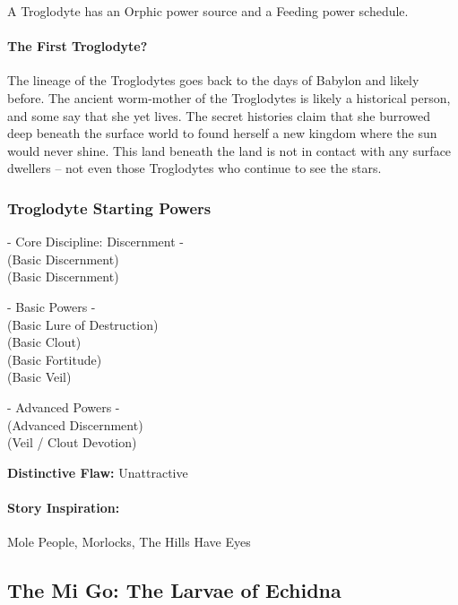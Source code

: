 A Troglodyte has an Orphic power source and a Feeding power schedule.

\paragraph{The First Troglodyte?} The lineage of the Troglodytes goes back to the days of Babylon and likely before. The ancient worm-mother of the Troglodytes is likely a historical person, and some say that she yet lives. The secret histories claim that she burrowed deep beneath the surface world to found herself a new kingdom where the sun would never shine. This land beneath the land is not in contact with any surface dwellers -- not even those Troglodytes who continue to see the stars.

\subsubsection{Troglodyte Starting Powers}

\hspace{\parindent} - Core Discipline: Discernment -\\
 (Basic Discernment)\\
 (Basic Discernment)

- Basic Powers -\\
 (Basic Lure of Destruction)\\
 (Basic Clout)\\
 (Basic Fortitude)\\
 (Basic Veil)

- Advanced Powers -\\
 (Advanced Discernment)\\
 (Veil / Clout Devotion)

\textbf{Distinctive Flaw:} Unattractive

\paragraph{Story Inspiration:} Mole People, Morlocks, The Hills Have Eyes

\subsection[Mi Go]{The Mi Go: The Larvae of Echidna} 

